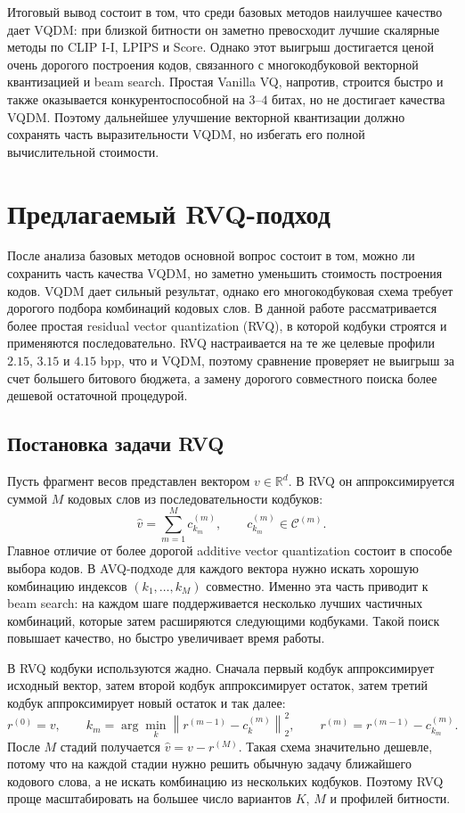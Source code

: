 \documentclass[a4paper,12pt]{article}
\begin{document}
Итоговый вывод состоит в том, что среди базовых методов наилучшее качество дает VQDM: при близкой битности он заметно превосходит лучшие скалярные методы по CLIP I-I, LPIPS и Score. Однако этот выигрыш достигается ценой очень дорогого построения кодов, связанного с многокодбуковой векторной квантизацией и beam search. Простая Vanilla VQ, напротив, строится быстро и также оказывается конкурентоспособной на $3$--$4$ битах, но не достигает качества VQDM. Поэтому дальнейшее улучшение векторной квантизации должно сохранять часть выразительности VQDM, но избегать его полной вычислительной стоимости.

\section{Предлагаемый RVQ-подход}

После анализа базовых методов основной вопрос состоит в том, можно ли сохранить часть качества VQDM, но заметно уменьшить стоимость построения кодов. VQDM дает сильный результат, однако его многокодбуковая схема требует дорогого подбора комбинаций кодовых слов. В данной работе рассматривается более простая residual vector quantization (RVQ), в которой кодбуки строятся и применяются последовательно. RVQ настраивается на те же целевые профили $2.15$, $3.15$ и $4.15$ bpp, что и VQDM, поэтому сравнение проверяет не выигрыш за счет большего битового бюджета, а замену дорогого совместного поиска более дешевой остаточной процедурой.

\subsection{Постановка задачи RVQ}

Пусть фрагмент весов представлен вектором $v \in \mathbb{R}^d$. В RVQ он аппроксимируется суммой $M$ кодовых слов из последовательности кодбуков:
\[
    \hat v
    =
    \sum_{m=1}^{M} c^{(m)}_{k_m},
    \qquad
    c^{(m)}_{k_m} \in \mathcal{C}^{(m)}.
\]
Главное отличие от более дорогой additive vector quantization состоит в способе выбора кодов. В AVQ-подходе для каждого вектора нужно искать хорошую комбинацию индексов $(k_1,\ldots,k_M)$ совместно. Именно эта часть приводит к beam search: на каждом шаге поддерживается несколько лучших частичных комбинаций, которые затем расширяются следующими кодбуками. Такой поиск повышает качество, но быстро увеличивает время работы.

В RVQ кодбуки используются жадно. Сначала первый кодбук аппроксимирует исходный вектор, затем второй кодбук аппроксимирует остаток, затем третий кодбук аппроксимирует новый остаток и так далее:
\[
    r^{(0)} = v,
    \qquad
    k_m = \arg\min_k \left\|r^{(m-1)} - c^{(m)}_k\right\|_2^2,
    \qquad
    r^{(m)} = r^{(m-1)} - c^{(m)}_{k_m}.
\]
После $M$ стадий получается $\hat v = v - r^{(M)}$. Такая схема значительно дешевле, потому что на каждой стадии нужно решить обычную задачу ближайшего кодового слова, а не искать комбинацию из нескольких кодбуков. Поэтому RVQ проще масштабировать на большее число вариантов $K$, $M$ и профилей битности.
\end{document}
